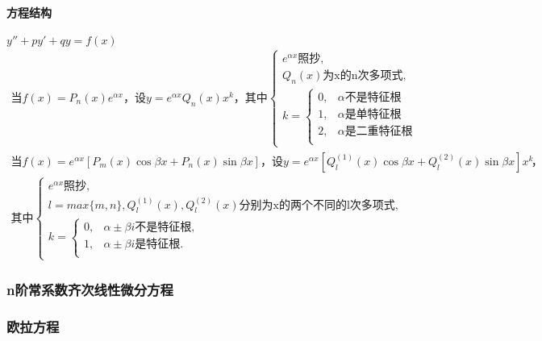 ﻿\documentclass[a4paper,12pt,UTF8]{ctexart}
\begin{document}
    \paragraph{方程结构} \(y''+py'+qy=f(x)\)
    \begin{align*}
        \text{当} f(x)=P_n(x)e^{\alpha x} \text{，设} y=e^{\alpha x}Q_n(x)x^k \text{，其中}
        \begin{cases}
            e^{\alpha x}\text{照抄},\\
            Q_n(x)\text{为x的n次多项式},\\
            k=
            \begin{cases}
                0, &\alpha\text{不是特征根}\\
                1, &\alpha\text{是单特征根}\\
                2, &\alpha\text{是二重特征根}\\
            \end{cases} 
        \end{cases} 
    \end{align*}
    \begin{align*}
        \text{当} f(x)=e^{\alpha x}\left[P_m(x)\cos \beta x + P_n(x)\sin \beta x\right] \text{，设} y=e^{\alpha x} \left[Q_l^{(1)}(x)\cos \beta x + Q_l^{(2)}(x)\sin \beta x\right]x^k& \text{，}\\
        \text{其中}
        \begin{cases}
            e^{\alpha x}\text{照抄},\\
            l=max\{m,n\},Q_l^{(1)}(x),Q_l^{(2)}(x)\text{分别为x的两个不同的l次多项式},\\
            k=
            \begin{cases}
                0, &\alpha\pm\beta i \text{不是特征根},\\
                1, &\alpha\pm\beta i \text{是特征根}.\\
            \end{cases} 
        \end{cases}
    \end{align*}

    \subsubsection{n阶常系数齐次线性微分方程}

    \subsubsection{欧拉方程}
\end{document}
